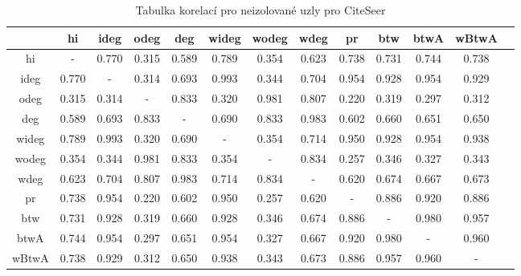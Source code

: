 \documentclass{bakalarka}
\begin{document}
\begin{table}[!ht]
\centering
\begin{sideways}
\begin{tabular}{c|cccccccccccc}
\toprule
&hi  &ideg &odeg &deg  &wideg&wodeg&wdeg &pr   &btw  &btwA &wBtwA\\
\midrule
hi   &  -  &0.770&0.315&0.589&0.789&0.354&0.623&0.738&0.731&0.744&0.738\\
ideg &0.770&  -  &0.314&0.693&0.993&0.344&0.704&0.954&0.928&0.954&0.929\\
odeg &0.315&0.314&  -  &0.833&0.320&0.981&0.807&0.220&0.319&0.297&0.312\\
deg  &0.589&0.693&0.833&  -  &0.690&0.833&0.983&0.602&0.660&0.651&0.650\\
wideg&0.789&0.993&0.320&0.690&  -  &0.354&0.714&0.950&0.928&0.954&0.938\\
wodeg&0.354&0.344&0.981&0.833&0.354&  -  &0.834&0.257&0.346&0.327&0.343\\
wdeg &0.623&0.704&0.807&0.983&0.714&0.834&  -  &0.620&0.674&0.667&0.673\\
pr   &0.738&0.954&0.220&0.602&0.950&0.257&0.620&  -  &0.886&0.920&0.886\\
btw  &0.731&0.928&0.319&0.660&0.928&0.346&0.674&0.886&  -  &0.980&0.957\\
btwA &0.744&0.954&0.297&0.651&0.954&0.327&0.667&0.920&0.980&  -  &0.960\\
wBtwA&0.738&0.929&0.312&0.650&0.938&0.343&0.673&0.886&0.957&0.960&  -  \\
\bottomrule
\end{tabular}
\end{sideways}
\caption{Tabulka korelací pro neizolované uzly pro CiteSeer}
\label{tab:corr3}
\end{table}
\end{document}
